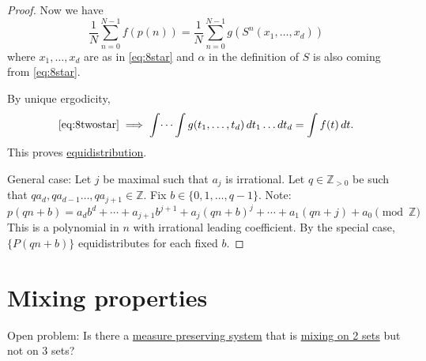 \documentclass{article}
\newcommand{\named}[1]{\textbf{#1}\index{#1}}
\begin{document}
\begin{proof}
  Now we have
  \begin{equation*}
    \frac{1}{N} \sum_{n=0}^{N-1} f(p(n)) = \frac{1}{N} \sum_{n=0}^{N-1} g(S^n (x_1, \dotsc, x_d)) \tag{$**$} \label{eq:8twostar}
  \end{equation*}
  where $x_1, \dotsc, x_d$ are as in \eqref{eq:8star} and $\alpha$ in the definition of $S$ is also coming from \eqref{eq:8star}.

  By unique ergodicity,
  \begin{equation*}
    \eqref{eq:8twostar} \implies \int \dotsi \int g(t_1, \dotsc, t_d) \, dt_1 \dots dt_d = \int f(t) \, dt.
  \end{equation*}
  This proves \hyperlink{def:equid}{equidistribution}.

  General case: Let $j$ be maximal such that $a_j$ is irrational.
  Let $q \in \mathbb{Z}_{>0}$ be such that $q a_d, q a_{d-1} \dotsc, q a_{j+1} \in \mathbb{Z}$.
  Fix $b \in \{0,1,\dotsc, q-1\}$. Note:
  \begin{equation*}
    p(qn+b) = a_d b^d + \dotsb + a_{j+1} b^{j+1} + a_j (qn+b)^j + \dotsb + a_1 (qn+j) + a_0 \pmod{\mathbb{Z}}
  \end{equation*}
  This is a polynomial in $n$ with irrational leading coefficient. By the special case, $\{P(qn+b)\}$ equidistributes for each fixed $b$.
\end{proof}

\clearpage
\section{Mixing properties}
Open problem: Is there a \hyperlink{def:mps}{measure preserving system} that is \hyperlink{def:mixingOn}{mixing on 2 sets} but not on 3 sets?
\end{document}
